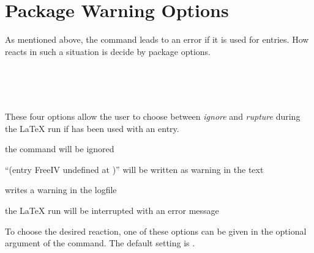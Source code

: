 \section{Package Warning Options}

As mentioned above, the command  leads to an error if it
is used for  entries. How  reacts in
such a situation is decide by package options.

\begin{Declaration}
  \\
  \\
  \\
\end{Declaration}%
%
%
These four options allow the user to choose between \emph{ignore} and
\emph{rupture} during the {\LaTeX} run if  has been used
with an  entry.

\begin{labeling}[~--]{}
\item[\Option{adrFreeIVempty}] 
        the command  will be ignored
\item[\Option{adrFreeIVshow}] 
        ``(entry FreeIV undefined at )'' will be
        written as warning in the text
\item[\Option{adrFreeIVwarn}]
        writes a warning in the logfile
\item[\Option{adrFreeIVstop}]
        the {\LaTeX} run will be interrupted with an error message
\end{labeling}
To choose the desired reaction, one of these options can be given in
the optional argument of the  command. The default
setting is .%
%
%

\endinput


